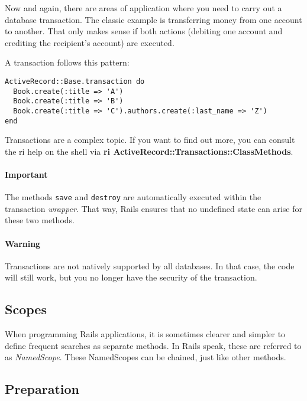 \documentclass[a4paper]{book}
\newcounter{tab}[chapter]
\begin{document}
Now and again, there are areas of application where you need to carry out a database transaction. The classic example is transferring money from one account to another. That only makes sense if both actions (debiting one account and crediting the recipient's account) are executed.

A transaction follows this pattern:

\begin{shaded}\begin{verbatim}
ActiveRecord::Base.transaction do
  Book.create(:title => 'A')
  Book.create(:title => 'B')
  Book.create(:title => 'C').authors.create(:last_name => 'Z')
end
\end{verbatim}\end{shaded}

Transactions are a complex topic. If you want to find out more, you can consult the ri help on the shell via \textbf{ri ActiveRecord::Transactions::ClassMethods}.

\paragraph{Important}\label{important-9}

The methods \texttt{save} and \texttt{destroy} are automatically executed within the transaction \emph{wrapper}. That way, Rails ensures that no undefined state can arise for these two methods.

\paragraph{Warning}\label{warning-5}

Transactions are not natively supported by all databases. In that case, the code will still work, but you no longer have the security of the transaction.

\subsection{Scopes}\label{scopes}

When programming Rails applications, it is sometimes clearer and simpler to define frequent searches as separate methods. In Rails speak, these are referred to as \emph{NamedScope}. These NamedScopes can be chained, just like other methods.

\subsection{Preparation}\label{preparation-2}
\end{document}
